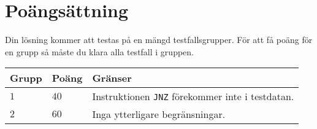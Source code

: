 \section*{Poängsättning}
Din lösning kommer att testas på en mängd testfallsgrupper.
För att få poäng för en grupp så måste du klara alla testfall i gruppen.


\noindent
\begin{tabular}{| l | l | p{12cm} |}
  \hline
  \textbf{Grupp} & \textbf{Poäng} & \textbf{Gränser} \\ \hline
  $1$    & $40$       & Instruktionen \texttt{JNZ} förekommer inte i testdatan. \\ \hline
  $2$    & $60$       & Inga ytterligare begränsningar. \\ \hline
\end{tabular}
